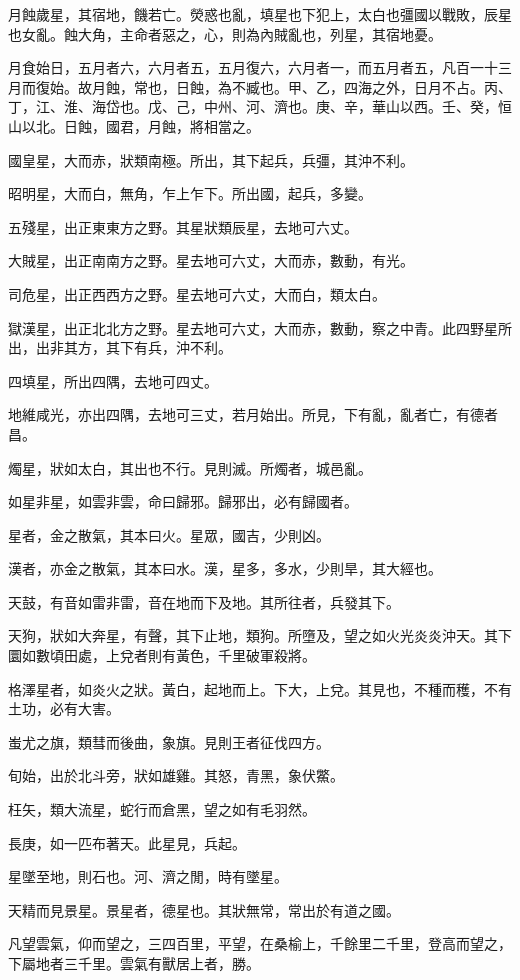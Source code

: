 月蝕歲星，其宿地，饑若亡。熒惑也亂，填星也下犯上，太白也彊國以戰敗，辰星也女亂。蝕大角，主命者惡之，心，則為內賊亂也，列星，其宿地憂。

月食始日，五月者六，六月者五，五月復六，六月者一，而五月者五，凡百一十三月而復始。故月蝕，常也，日蝕，為不臧也。甲、乙，四海之外，日月不占。丙、丁，江、淮、海岱也。戊、己，中州、河、濟也。庚、辛，華山以西。壬、癸，恒山以北。日蝕，國君，月蝕，將相當之。

國皇星，大而赤，狀類南極。所出，其下起兵，兵彊，其沖不利。

昭明星，大而白，無角，乍上乍下。所出國，起兵，多變。

五殘星，出正東東方之野。其星狀類辰星，去地可六丈。

大賊星，出正南南方之野。星去地可六丈，大而赤，數動，有光。

司危星，出正西西方之野。星去地可六丈，大而白，類太白。

獄漢星，出正北北方之野。星去地可六丈，大而赤，數動，察之中青。此四野星所出，出非其方，其下有兵，沖不利。

四填星，所出四隅，去地可四丈。

地維咸光，亦出四隅，去地可三丈，若月始出。所見，下有亂，亂者亡，有德者昌。

燭星，狀如太白，其出也不行。見則滅。所燭者，城邑亂。

如星非星，如雲非雲，命曰歸邪。歸邪出，必有歸國者。

星者，金之散氣，其本曰火。星眾，國吉，少則凶。

漢者，亦金之散氣，其本曰水。漢，星多，多水，少則旱，其大經也。

天鼓，有音如雷非雷，音在地而下及地。其所往者，兵發其下。

天狗，狀如大奔星，有聲，其下止地，類狗。所墮及，望之如火光炎炎沖天。其下圜如數頃田處，上兌者則有黃色，千里破軍殺將。

格澤星者，如炎火之狀。黃白，起地而上。下大，上兌。其見也，不種而穫，不有土功，必有大害。

蚩尤之旗，類彗而後曲，象旗。見則王者征伐四方。

旬始，出於北斗旁，狀如雄雞。其怒，青黑，象伏鱉。

枉矢，類大流星，蛇行而倉黑，望之如有毛羽然。

長庚，如一匹布著天。此星見，兵起。

星墜至地，則石也。河、濟之閒，時有墜星。

天精而見景星。景星者，德星也。其狀無常，常出於有道之國。

凡望雲氣，仰而望之，三四百里，平望，在桑榆上，千餘里二千里，登高而望之，下屬地者三千里。雲氣有獸居上者，勝。

